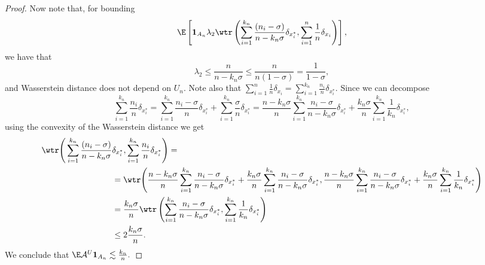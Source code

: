 \begin{proof}
    Now note that, for bounding 
    \[
    \E \left[\mathbf{1}_{A_n}\lambda_2\wtr \left( \sum_{i = 1}^{k_n} \frac{(n_i-\sigma)}{n-k_n\sigma}\delta_{x_i^*},\sum_{i = 1}^n\frac{1}{n}\delta_{x_i}\right)\right],
    \]
    we have that
    \[
    \lambda_2 \leq \frac{n}{n - k_n \sigma}\leq \frac{n}{n(1-\sigma)}=\frac{1}{1-\sigma},
    \]
    and Wasserstein distance does not depend on $U_n.$ Note also that $\sum_{i = 1}^n \frac{1}{n}\delta_{x_i} = \sum_{i = 1}^{k_n}\frac{n_i}{n}\delta_{x_i^*}$. Since we can decompose
    \[
    \sum_{i = 1}^{k_n}\frac{n_i}{n}\delta_{x_i^*} = \sum_{i = 1}^{k_n} \frac{n_i-\sigma}{n}\delta_{x_i^*} + \sum_{i = 1}^{k_n} \frac{\sigma}{n}\delta_{x_i^*} = 
    \frac{n-k_n\sigma}{n}\sum_{i = 1}^{k_n} \frac{n_i - \sigma}{n - k_n\sigma}\delta_{x_i^*} + \frac{k_n \sigma}{n}\sum_{i = 1}^{k_n}\frac{1}{k_n} \delta_{x_i^*},
    \]
    using the convexity of the Wasserstein distance we get
    \begin{align*}
        \wtr\Bigg( \sum_{i = 1}^{k_n} \frac{(n_i-\sigma)}{n-k_n\sigma}&\delta_{x_i^*},\sum_{i = 1}^{k_n}\frac{n_i}{n}\delta_{x_i^*}\Bigg) = \\
        & = \wtr \Bigg( \frac{n-k_n\sigma}{n}\sum_{i = 1}^{k_n} \frac{n_i - \sigma}{n - k_n\sigma}\delta_{x_i^*} + \frac{k_n \sigma}{n}\sum_{i = 1}^{k_n}\frac{n_i - \sigma}{n - k_n\sigma} \delta_{x_i^*}, \frac{n-k_n\sigma}{n}\sum_{i = 1}^{k_n} \frac{n_i - \sigma}{n - k_n\sigma}\delta_{x_i^*} + \frac{k_n \sigma}{n}\sum_{i = 1}^{k_n}\frac{1}{k_n} \delta_{x_i^*}\Bigg) \\
        & = \frac{k_n \sigma}{n} \wtr\left( \sum_{i = 1}^{k_n} \frac{n_i - \sigma}{n - k_n\sigma}\delta_{x_i^*}, \sum_{i = 1}^{k_n}\frac{1}{k_n}\delta_{x_i^*}\right) \\
        & \leq 2 \frac{k_n\sigma}{n}.
    \end{align*}
    We conclude that $\E \mathcal{A}^U \mathbf{1}_{A_n} \lesssim \frac{k_n}{n}.$


\end{proof}
